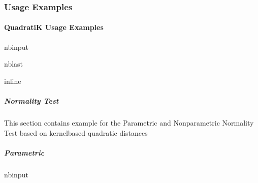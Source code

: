 \documentclass[letterpaper,10pt,english,openany,oneside]{sphinxmanual}
\begin{document}
{{{{\subsubsection{Usage Examples}
\label{\detokenize{user_guide/index:usage-examples}}
\sphinxstepscope


\paragraph{QuadratiK Usage Examples}
\label{\detokenize{user_guide/basic_usage:QuadratiK-Usage-Examples}}\label{\detokenize{user_guide/basic_usage::doc}}
\begin{sphinxuseclass}{nbinput}
\begin{sphinxuseclass}{nblast}
{
\begin{sphinxVerbatim}[commandchars=\\\{\}]
\llap{\color{nbsphinxin}[1]:\,\hspace{\fboxrule}\hspace{\fboxsep}} inline
   
   

   
\end{sphinxVerbatim}
}

\end{sphinxuseclass}
\end{sphinxuseclass}

\subparagraph{Normality Test}
\label{\detokenize{user_guide/basic_usage:Normality-Test}}
\sphinxAtStartPar
This section contains example for the Parametric and Non\sphinxhyphen{}parametric Normality Test based on kernel\sphinxhyphen{}based quadratic distances


\subparagraph{Parametric}
\label{\detokenize{user_guide/basic_usage:Parametric}}
\begin{sphinxuseclass}{nbinput}
{
\begin{sphinxVerbatim}[commandchars=\\\{\}]
\llap{\color{nbsphinxin}[2]:\,\hspace{\fboxrule}\hspace{\fboxsep}}   


\end{sphinxVerbatim}}
\end{sphinxuseclass}}}}}
\end{document}
